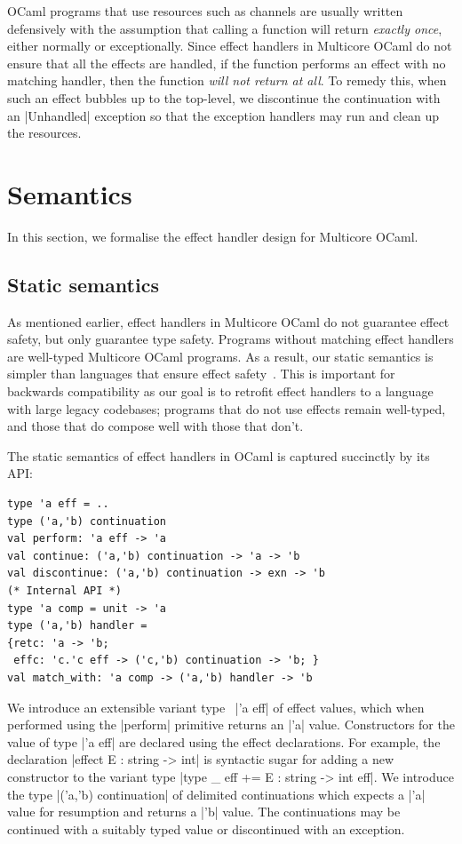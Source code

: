 \documentclass[sigplan,screen]{acmart}
\begin{document}
OCaml programs that use resources such as channels are usually written
defensively with the assumption that calling a function will return
\emph{exactly once}, either normally or exceptionally. Since effect handlers in
Multicore OCaml do not ensure that all the effects are handled, if the function
performs an effect with no matching handler, then the function \emph{will not
return at all}. To remedy this, when such an effect bubbles up to the
top-level, we discontinue the continuation with an |Unhandled| exception so
that the exception handlers may run and clean up the resources.

\section{Semantics}
\label{sec:semantics}

In this section, we formalise the effect handler design for Multicore OCaml.

\subsection{Static semantics}
\label{sec:static_semantics}

As mentioned earlier, effect handlers in Multicore OCaml do not guarantee
effect safety, but only guarantee type safety. Programs without matching effect
handlers are well-typed Multicore OCaml programs. As a result, our static
semantics is simpler than languages that ensure effect safety~\cite{Eff,
Hillerstrom20, Leijen14, Effekt, Frank, Biernacki19}. This is important for
backwards compatibility as our goal is to retrofit effect handlers to a
language with large legacy codebases; programs that do not use effects remain
well-typed, and those that do compose well with those that don't.

The static semantics of effect handlers in OCaml is captured succinctly by its
API:
\begin{lstlisting}
type 'a eff = ..
type ('a,'b) continuation
val perform: 'a eff -> 'a
val continue: ('a,'b) continuation -> 'a -> 'b
val discontinue: ('a,'b) continuation -> exn -> 'b
(* Internal API *)
type 'a comp = unit -> 'a
type ('a,'b) handler =
{retc: 'a -> 'b;
 effc: 'c.'c eff -> ('c,'b) continuation -> 'b; }
val match_with: 'a comp -> ('a,'b) handler -> 'b
\end{lstlisting}
We introduce an extensible variant type~\cite{ExtVariants} |'a eff| of effect
values, which when performed using the |perform| primitive returns an |'a|
value. Constructors for the value of type |'a eff| are declared using the
effect declarations. For example, the declaration |effect E : string -> int|
is syntactic sugar for adding a new constructor to the variant type
|type _ eff += E : string -> int eff|. We introduce the type
|('a,'b) continuation| of delimited continuations which expects a |'a| value for
resumption and returns a |'b| value. The continuations may be continued with a
suitably typed value or discontinued with an exception.
\end{document}
